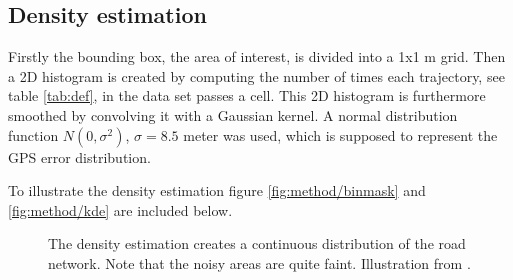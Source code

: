 \subsection{Density estimation}
\label{chp:method.sec:map.sub:den}

Firstly the bounding box, the area of interest, is divided into a 1x1 m grid. Then a 2D histogram is created by computing the number of times each trajectory, see table \ref{tab:def}, in the data set passes a cell. This 2D histogram is furthermore smoothed by convolving it with a Gaussian kernel. A normal distribution function $N(0, \sigma^2)$, $\sigma = 8.5$ meter was used, which is supposed to represent the \ac{GPS} error distribution. 

To illustrate the density estimation figure \ref{fig:method/binmask} and \ref{fig:method/kde} are included below. 

\begin{figure}[H]%
 \centering
 \caption{The density estimation creates a continuous distribution of the road network. Note that the noisy areas are quite faint. Illustration from \citep{biagioni:gis12}.}%
 \label{fig:method/binmaskkde}
\end{figure}

